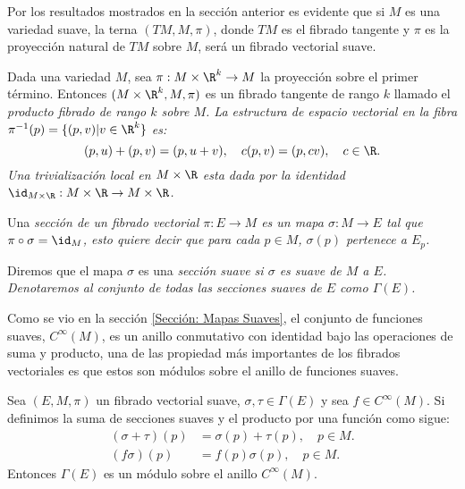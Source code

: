 \begin{example}
	Por los resultados mostrados en la sección anterior es evidente que si $M$ es una variedad suave, la terna $(TM, M, \pi)$, donde $TM$ es el fibrado tangente y $\pi$ es la proyección natural de $TM$ sobre $M$, será un fibrado vectorial suave.
\end{example}

\begin{example}
	Dada una variedad $M$, sea $\pi: M \times \R^{k} \to M$ la proyección sobre el primer término. Entonces $(M \times \R^{k}, M, \pi)$ es un fibrado tangente de rango $k$ llamado el \it{producto fibrado} de rango $k$ sobre $M$. La estructura de espacio vectorial en la fibra $\pi^{-1}(p) = \{(p,v) | v \in \R^{k}\}$ es:
	\[
		(p,u) + (p,v) = (p, u+v), \quad c(p,v) = (p,cv), \quad c \in \R.
	\]
	Una trivialización local en $M \times \R$ esta dada por la identidad $\id_{M \times \R}: M \times \R \to  M \times \R$.
\end{example}

\begin{definition}
	Una \it{sección} de un fibrado vectorial $\pi: E \to M$ es un mapa $\sigma: M \to E$ tal que $\pi \circ \sigma = \id_{M}$, esto quiere decir que para cada $p \in M$, $\sigma(p)$ pertenece a $E_p$.

	Diremos que el mapa $\sigma$ es una \it{sección suave} si $\sigma$ es suave de $M$ a $E$. Denotaremos al conjunto de todas las secciones suaves de $E$ como $\Gamma(E)$.
\end{definition}

Como se vio en la sección \ref{Sección: Mapas Suaves}, el conjunto de funciones suaves, $C^{\infty}(M)$, es un anillo conmutativo con identidad bajo las operaciones de suma y producto, una de las propiedad más importantes de los fibrados vectoriales es que estos son módulos sobre el anillo de funciones suaves.

\begin{theorem}\label{Teorema: Los Fibrados Vectoriales Son Modulos}
	Sea $(E,M, \pi)$ un fibrado vectorial suave, $\sigma, \tau \in \Gamma(E)$ y sea $f \in C^{\infty}(M)$. Si definimos la suma de secciones suaves y el producto por una función como sigue:
	\begin{align*}
		(\sigma + \tau)(p) & = \sigma(p) + \tau(p), \quad p \in M. \\
		(f\sigma)(p)       & = f(p)\sigma(p), \quad p \in M.
	\end{align*}
	Entonces $\Gamma(E)$ es un módulo sobre el anillo $C^{\infty}(M)$.
\end{theorem}

